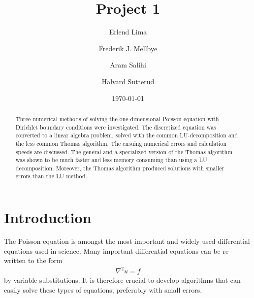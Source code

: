 \documentclass[aps,reprint]{revtex4-1}
\begin{document}
\title{Project 1}
\author{Erlend Lima}
\author{Frederik J. Mellbye}
\author{Aram Salihi}
\author{Halvard Sutterud}
\date{\today}

\begin{abstract}
      Three numerical methods of solving the one-dimensional Poisson equation with Dirichlet
      boundary conditions were investigated. The discretized equation was converted
      to a linear algebra problem, solved with the common LU-decomposition and the less
      common Thomas algorithm. The ensuing numerical errors and calculation speeds are discussed.
      The general and a specialized version of the Thomas algorithm was
      shown to be much faster and less memory consuming than using a LU decomposition. Moreover,
      the Thomas algorithm produced solutions with smaller errors than the LU method.
\end{abstract}
\maketitle
\tableofcontents
\makeatletter
\let\toc@pre\relax
\let\toc@post\relax
\makeatother 

\newpage

%
%
\section{Introduction}
The Poisson equation is amongst the most important and widely used differential
equations used in science.
Many important differential equations can be re-written to
the form
\begin{align*}
  \nabla^2 u = f
\end{align*}
by variable substitutions. It is therefore crucial to develop algorithms
that can easily solve these types of equations, preferably with small errors.
\end{document}

